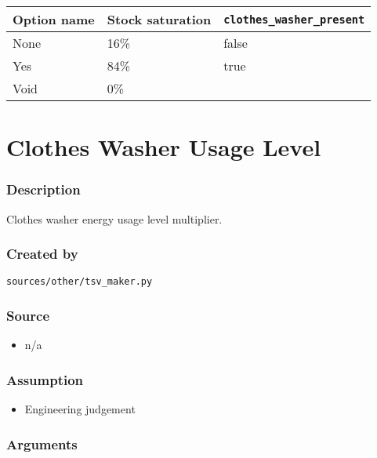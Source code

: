 \begin{longtable}[]{@{}lll@{}}
\toprule\noalign{}
Option name & Stock saturation & \texttt{clothes\_washer\_present} \\
\midrule\noalign{}
\endhead
\bottomrule\noalign{}
\endlastfoot
None & 16\% & false \\
Yes & 84\% & true \\
Void & 0\% & \\
\end{longtable}

\section{Clothes Washer Usage
Level}\label{clothes_washer_usage_level}

\subsubsection{Description}\label{description-19}

Clothes washer energy usage level multiplier.

\subsubsection{Created by}\label{created-by-19}

\texttt{sources/other/tsv\_maker.py}

\subsubsection{Source}\label{source-19}

\begin{itemize}
 
\item
  n/a
\end{itemize}

\subsubsection{Assumption}\label{assumption-10}

\begin{itemize}
 
\item
  Engineering judgement
\end{itemize}

\subsubsection{Arguments}\label{arguments-10}

